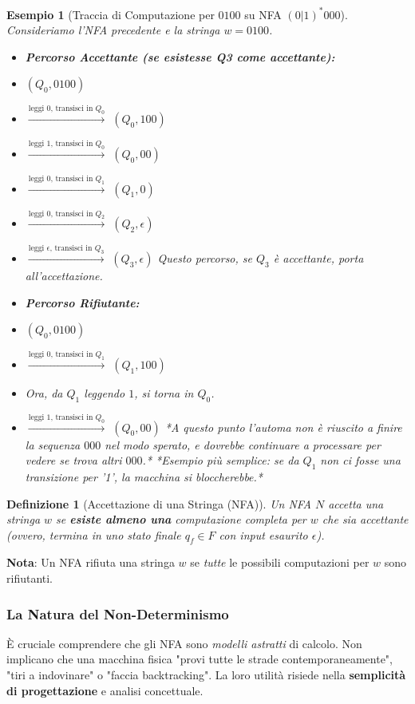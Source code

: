 \documentclass[a4paper, 11pt]{book} %
\newtheorem{definition}[theorem]{Definizione}
\newtheorem{example}[theorem]{Esempio}
\theoremstyle{definition}
\begin{document}
\begin{example}[Traccia di Computazione per $0100$ su NFA $(0|1)^*000$]
Consideriamo l'NFA precedente e la stringa $w = 0100$.
\begin{itemize}
    \item \textbf{Percorso Accettante (se esistesse Q3 come accettante):}
    \item $(Q_0, 0100)$
    \item $\xrightarrow{\text{leggi 0, transisci in } Q_0}$ $(Q_0, 100)$
    \item $\xrightarrow{\text{leggi 1, transisci in } Q_0}$ $(Q_0, 00)$
    \item $\xrightarrow{\text{leggi 0, transisci in } Q_1}$ $(Q_1, 0)$
    \item $\xrightarrow{\text{leggi 0, transisci in } Q_2}$ $(Q_2, \epsilon)$
    \item $\xrightarrow{\text{leggi } \epsilon \text{, transisci in } Q_3}$ $(Q_3, \epsilon)$
    Questo percorso, se $Q_3$ è accettante, porta all'accettazione.

    \item \textbf{Percorso Rifiutante:}
    \item $(Q_0, 0100)$
    \item $\xrightarrow{\text{leggi 0, transisci in } Q_1}$ $(Q_1, 100)$
    \item Ora, da $Q_1$ leggendo $1$, si torna in $Q_0$.
    \item $\xrightarrow{\text{leggi 1, transisci in } Q_0}$ $(Q_0, 00)$
    *A questo punto l'automa non è riuscito a finire la sequenza $000$ nel modo sperato, e dovrebbe continuare a processare per vedere se trova altri $000$.*
    *Esempio più semplice: se da $Q_1$ non ci fosse una transizione per '1', la macchina si bloccherebbe.*
\end{itemize}
\end{example}

\begin{definition}[Accettazione di una Stringa (NFA)]
Un NFA $N$ \emph{accetta} una stringa $w$ se \textbf{esiste almeno una} computazione completa per $w$ che sia accettante (ovvero, termina in uno stato finale $q_f \in F$ con input esaurito $\epsilon$).
\end{definition}
\noindent \textbf{Nota}: Un NFA rifiuta una stringa $w$ se \emph{tutte} le possibili computazioni per $w$ sono rifiutanti.

\subsubsection*{La Natura del Non-Determinismo}
È cruciale comprendere che gli NFA sono \emph{modelli astratti} di calcolo. Non implicano che una macchina fisica "provi tutte le strade contemporaneamente", "tiri a indovinare" o "faccia backtracking". La loro utilità risiede nella \textbf{semplicità di progettazione} e analisi concettuale.
\end{document}
